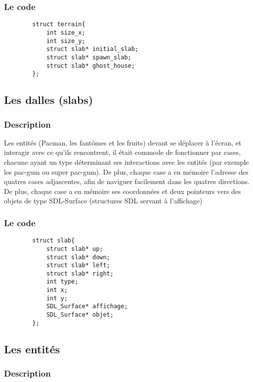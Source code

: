 \documentclass[a4paper,11pt]{article}
\begin{document}
    \subsubsection{Le code}

    \begin{verbatim}
        struct terrain{
            int size_x;
            int size_y;    
            struct slab* initial_slab;
            struct slab* spawn_slab;
            struct slab* ghost_house;
        };
    \end{verbatim}

    \subsection{Les dalles (slabs)}

    \subsubsection{Description}

    Les entités (Pacman, les fantômes et les fruits) devant se déplacer à l'écran, et interagir avec ce qu'ils rencontrent, il était commode de fonctionner par cases, chacune ayant un type déterminant ses interactions avec les entités (par exemple les pac-gum ou super pac-gum). De plus, chaque case a en mémoire l'adresse des quatres cases adjascentes, afin de naviguer facilement dans les quatres directions. De plus, chaque case a en mémoire ses coordonnées et deux pointeurs vers des objets de type SDL-Surface (structures SDL servant à l'affichage)

    \subsubsection{Le code}

    \begin{verbatim}
        struct slab{
            struct slab* up;
            struct slab* down;
            struct slab* left;
            struct slab* right;
            int type;
            int x;
            int y;
            SDL_Surface* affichage;
            SDL_Surface* objet;
        };
    \end{verbatim}

    \subsection{Les entités}

    \subsubsection{Description}
\end{document}

